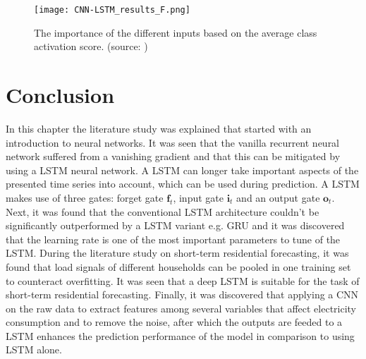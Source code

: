 \begin{figure}[h!]
	\centering
	\texttt{[image: CNN-LSTM\_results\_F.png]}
	\caption{The importance of the different inputs based on the average class activation score. (source: \cite{Kim2019})}
	\label{fig:LSTM_lit_results}
\end{figure}

\newpage
\section{Conclusion}
In this chapter the literature study was explained that started with an introduction to neural networks. It was seen that the vanilla recurrent neural network suffered from a vanishing gradient and that this can be mitigated by using a LSTM neural network. A LSTM can longer take important aspects of the presented time series into account, which can be used during prediction. A LSTM makes use of three gates: forget gate $ \textbf{f}_t $, input gate $ \textbf{i}_t $ and an output gate $ \textbf{o}_t $. Next, it was found that the conventional LSTM architecture couldn't be significantly outperformed by a LSTM variant e.g. GRU and it was discovered that the learning rate is one of the most important parameters to tune of the LSTM. During the literature study on short-term residential forecasting, it was found that load signals of different households can be pooled in one training set to counteract overfitting. It was seen that a deep LSTM is suitable for the task of short-term residential forecasting. Finally, it was discovered that applying a CNN on the raw data to extract features among several variables that affect electricity consumption and to remove the noise, after which the outputs are feeded to a LSTM enhances the prediction performance of the model in comparison to using LSTM alone.




